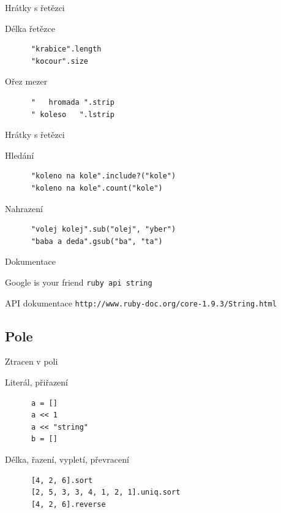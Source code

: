\documentclass{beamer}
\begin{document}
\begin{frame}[fragile]{Hrátky s řetězci}
  \begin{block}{Délka řetězce}
    \begin{verbatim}
      "krabice".length
      "kocour".size
    \end{verbatim}
  \end{block}
  \pause
  \begin{block}{Ořez mezer}
    \begin{verbatim}
      "   hromada ".strip
      " koleso   ".lstrip
    \end{verbatim}
  \end{block}
\end{frame}

\begin{frame}[fragile]{Hrátky s řetězci}
  \begin{block}{Hledání}
    \begin{verbatim}
      "koleno na kole".include?("kole")
      "koleno na kole".count("kole")
    \end{verbatim}
  \end{block}
  \pause
  \begin{block}{Nahrazení}
    \begin{verbatim}
      "volej kolej".sub("olej", "yber")
      "baba a deda".gsub("ba", "ta")
    \end{verbatim}
  \end{block}
\end{frame}

\begin{frame}{Dokumentace}
  \begin{block}{Google is your friend}
    \texttt{ruby api string}
  \end{block}
  \begin{block}{API dokumentace}
    \texttt{http://www.ruby-doc.org/core-1.9.3/String.html}
  \end{block}
\end{frame}

\subsection{Pole}

\begin{frame}[fragile]{Ztracen v poli}
  \begin{block}{Literál, přiřazení}
    \begin{verbatim}
      a = []
      a << 1
      a << "string"
      b = []
    \end{verbatim}
  \end{block}
  \pause
  \begin{block}{Délka, řazení, vypletí, převracení}
    \begin{verbatim}
      [4, 2, 6].sort
      [2, 5, 3, 3, 4, 1, 2, 1].uniq.sort
      [4, 2, 6].reverse
    \end{verbatim}
  \end{block}
\end{frame}
\end{document}
